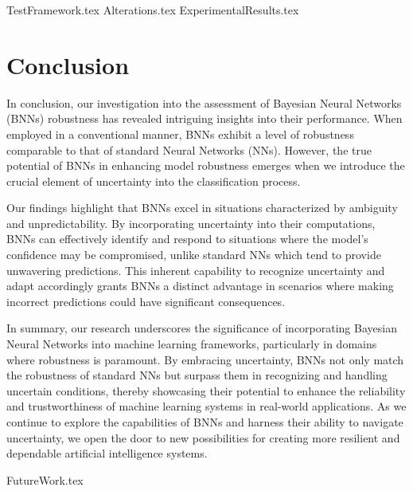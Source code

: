 \documentclass[
	a4paper,
	cleardoublepage=empty,
	headings=twolinechapter,
	numbers=autoenddot,
]{scrbook}
\begin{document}
	{TestFramework.tex}
	{Alterations.tex}
	{ExperimentalResults.tex}
	
	\chapter{Conclusion}
	
	In conclusion, our investigation into the assessment of Bayesian Neural Networks (BNNs) robustness has revealed intriguing insights into their performance. When employed in a conventional manner, BNNs exhibit a level of robustness comparable to that of standard Neural Networks (NNs). However, the true potential of BNNs in enhancing model robustness emerges when we introduce the crucial element of uncertainty into the classification process.
	
	Our findings highlight that BNNs excel in situations characterized by ambiguity and unpredictability. By incorporating uncertainty into their computations, BNNs can effectively identify and respond to situations where the model's confidence may be compromised, unlike standard NNs which tend to provide unwavering predictions. This inherent capability to recognize uncertainty and adapt accordingly grants BNNs a distinct advantage in scenarios where making incorrect predictions could have significant consequences.
	
	In summary, our research underscores the significance of incorporating Bayesian Neural Networks into machine learning frameworks, particularly in domains where robustness is paramount. By embracing uncertainty, BNNs not only match the robustness of standard NNs but surpass them in recognizing and handling uncertain conditions, thereby showcasing their potential to enhance the reliability and trustworthiness of machine learning systems in real-world applications. As we continue to explore the capabilities of BNNs and harness their ability to navigate uncertainty, we open the door to new possibilities for creating more resilient and dependable artificial intelligence systems.
	
	{FutureWork.tex}
	
	
	
	
	
	
\end{document}
